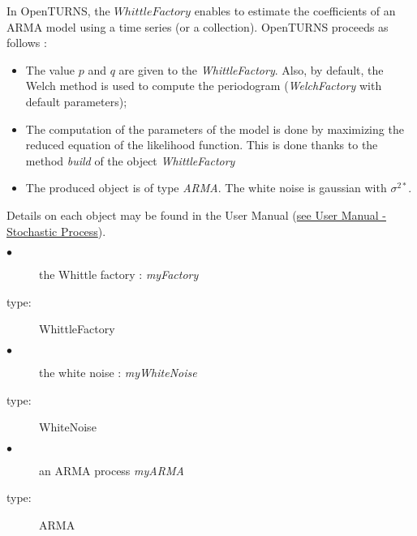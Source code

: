 In OpenTURNS, the $WhittleFactory$ enables to estimate the coefficients of an ARMA model using a time series (or a collection).
OpenTURNS proceeds as follows :

\begin{itemize}
\item The value $p$ and $q$ are given to the \emph{WhittleFactory}. Also, by default, the Welch method is used to compute the periodogram (\emph{WelchFactory} with default parameters);
\item The computation of the parameters of the model is done by maximizing the reduced equation of the likelihood function.
This is done thanks to the method \emph{build} of the object \emph{WhittleFactory}
\item The produced object is of type \emph{ARMA}. The white noise is gaussian with $\sigma^{2*}$.
\end{itemize}

Details on each object may be found in the User Manual (\href{OpenTURNS_UserManual_TUI.pdf}{see User Manual - Stochastic Process}).\\


{
  \begin{description}
  \item[$\bullet$] the Whittle factory : {\itshape myFactory}
  \item[type:]  WhittleFactory
  \end{description}

  \begin{description}
  \item[$\bullet$] the white noise : {\itshape myWhiteNoise}
  \item[type:]  WhiteNoise
  \end{description}

  \begin{description}
  \item[$\bullet$] an ARMA process {\itshape myARMA}
  \item[type:]  ARMA
  \end{description}

}

